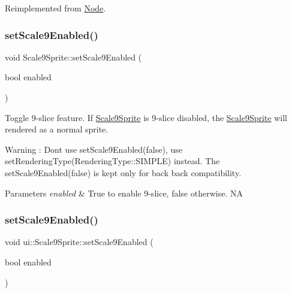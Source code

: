 Reimplemented from \hyperlink{classNode_a31f8130cfd505a5c327c4cc66fe4fa69}{Node}.

\mbox{\label{classui_1_1Scale9Sprite_a1a1b73a9df09b09334e13b4e2f447038}} 
\subsubsection{\texorpdfstring{set\+Scale9\+Enabled()}{setScale9Enabled()}\hspace{0.1cm}{\footnotesize\ttfamily [1/2]}}
{\footnotesize\ttfamily void Scale9\+Sprite\+::set\+Scale9\+Enabled (\begin{DoxyParamCaption}\item[{bool}]{enabled }\end{DoxyParamCaption})}



Toggle 9-\/slice feature. If \hyperlink{classui_1_1Scale9Sprite}{Scale9\+Sprite} is 9-\/slice disabled, the \hyperlink{classui_1_1Scale9Sprite}{Scale9\+Sprite} will rendered as a normal sprite. 

\begin{DoxyWarning}{Warning}
\+: Don\textquotesingle{}t use set\+Scale9\+Enabled(false), use set\+Rendering\+Type(\+Rendering\+Type\+::\+S\+I\+M\+P\+L\+E) instead. The set\+Scale9\+Enabled(false) is kept only for back back compatibility. 
\end{DoxyWarning}

\begin{DoxyParams}{Parameters}
{\em enabled} & True to enable 9-\/slice, false otherwise.  NA \\
\hline
\end{DoxyParams}
\mbox{\label{classui_1_1Scale9Sprite_a958f507e81b8c94a1b72eeeeb2f57ce7}} 
\subsubsection{\texorpdfstring{set\+Scale9\+Enabled()}{setScale9Enabled()}\hspace{0.1cm}{\footnotesize\ttfamily [2/2]}}
{\footnotesize\ttfamily void ui\+::\+Scale9\+Sprite\+::set\+Scale9\+Enabled (\begin{DoxyParamCaption}\item[{bool}]{enabled }\end{DoxyParamCaption})}



